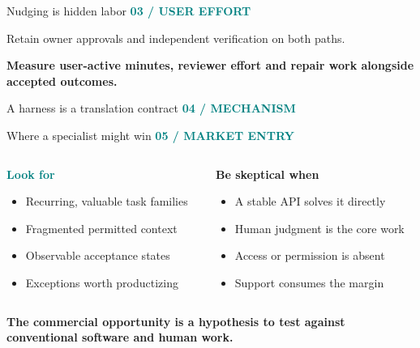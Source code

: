 \documentclass[aspectratio=169,11pt]{beamer}
\newcommand{\eyebrow}[1]{\textcolor{teal}{\textsf{\scriptsize\bfseries #1}}\par\vspace{.18cm}}
\newcommand{\takeaway}[1]{\vfill\colorbox{pale}{\parbox{.96\linewidth}{\vspace{.13cm}\small\textbf{#1}\vspace{.13cm}}}}
\newcommand{\scope}[1]{\par\vspace{.15cm}{\scriptsize #1}\par}
\providecommand{\variant}{argument}
\begin{document}
\begin{frame}{Nudging is hidden labor}
\eyebrow{03 / USER EFFORT}
\resizebox{\linewidth}{!}{}
\vspace{.25cm}
Retain owner approvals and independent verification on both paths.
\scope{Schematic responsibilities, not measured minutes saved. Reframing and context transfer are human work.}
\takeaway{Measure user-active minutes, reviewer effort and repair work alongside accepted outcomes.}
\end{frame}

\begin{frame}{A harness is a translation contract}
\eyebrow{04 / MECHANISM}

\end{frame}

\begin{frame}{Where a specialist might win}
\eyebrow{05 / MARKET ENTRY}
\begin{columns}[T]
\begin{column}{.49\linewidth}
\textcolor{teal}{\bfseries Look for}\par
\begin{itemize}
\item Recurring, valuable task families
\item Fragmented permitted context
\item Observable acceptance states
\item Exceptions worth productizing
\end{itemize}
\end{column}
\begin{column}{.49\linewidth}
\textcolor{rust}{\bfseries Be skeptical when}\par
\begin{itemize}
\item A stable API solves it directly
\item Human judgment is the core work
\item Access or permission is absent
\item Support consumes the margin
\end{itemize}
\end{column}
\end{columns}
\scope{Credentials, enrollment and authorized defensive work illustrate workflow friction; they do not establish a market.}
\takeaway{The commercial opportunity is a hypothesis to test against conventional software and human work.}
\end{frame}
\end{document}
